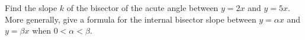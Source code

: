 Find the slope $k$ of the bisector of the acute angle between $y=2x$ and $y=5x$. More generally, give a formula for the internal bisector slope between $y=\alpha x$ and $y=\beta x$ when $0<\alpha<\beta$.
